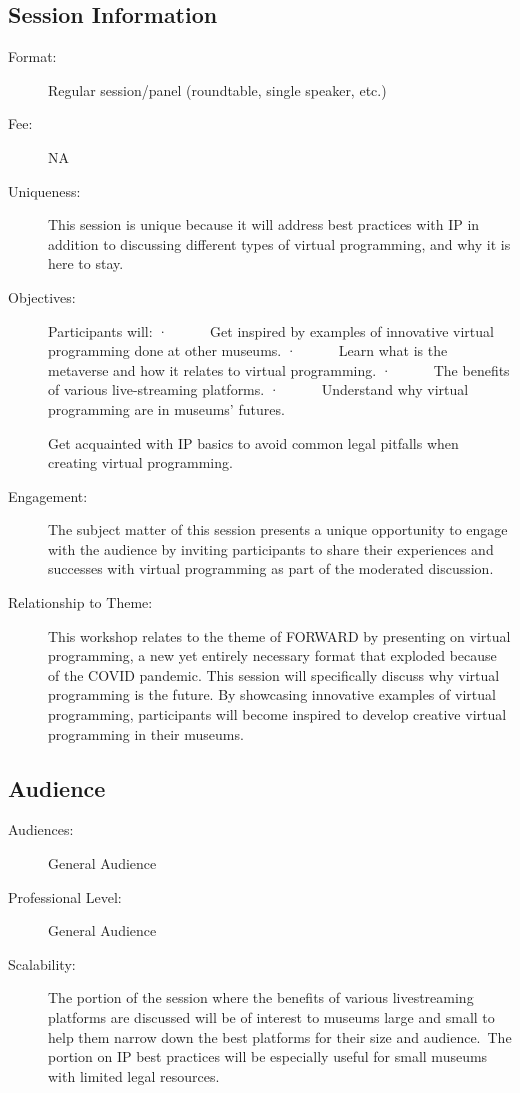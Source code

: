 \documentclass{report}
\begin{document}
              \subsection*{Session Information}
                \begin{description}
                  \item [Format:] Regular session/panel (roundtable, single speaker, etc.)
							    
								  \item [Fee:]NA
							     
							    \item [Uniqueness:]This session is unique because it will address best practices with IP in addition to discussing different types of virtual programming, and why it is here to stay.
							    \item [Objectives:]Participants will:
·      Get inspired by examples of innovative virtual programming done at other museums.
·      Learn what is the metaverse and how it relates to virtual programming.
·      The benefits of various live-streaming platforms.
·      Understand why virtual programming are in museums’ futures.
  

Get acquainted with IP basics to avoid common legal pitfalls when creating virtual programming.
							    \item [Engagement:]The subject matter of this session presents a unique opportunity to engage with the audience by inviting participants to share their experiences and successes with virtual programming as part of the moderated discussion.
							    \item [Relationship to Theme:]This workshop relates to the theme of FORWARD by presenting on virtual programming, a new yet entirely necessary format that exploded because of the COVID pandemic.  This session will specifically discuss why virtual programming is the future.  By showcasing innovative examples of virtual programming, participants will become inspired to develop creative virtual programming in their museums.
							    
                \end{description}
              \subsection*{Audience}
                \begin{description}
                  \item [Audiences:]General Audience~
                  \item[Professional Level:]General Audience~
                \item[Scalability:]   The portion of the session where the benefits of various livestreaming platforms are discussed will be of interest to museums large and small to help them narrow down the best platforms for their size and audience. The portion on IP best practices will be especially useful for small museums with limited legal resources.
  

							
              \end{description}
\end{document}
